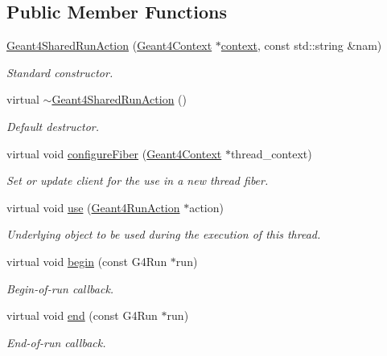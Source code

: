 \subsection*{Public Member Functions}
\begin{DoxyCompactItemize}
\item 
\hyperlink{class_d_d4hep_1_1_simulation_1_1_geant4_shared_run_action_a2d1a2043768ca1aff6aef303ad32b473}{Geant4\+Shared\+Run\+Action} (\hyperlink{class_d_d4hep_1_1_simulation_1_1_geant4_context}{Geant4\+Context} $\ast$\hyperlink{class_d_d4hep_1_1_simulation_1_1_geant4_action_aa9d87f0ec2a72b7fc2591b18f98d75cf}{context}, const std\+::string \&nam)
\begin{DoxyCompactList}\small\item\em Standard constructor. \end{DoxyCompactList}\item 
virtual \hyperlink{class_d_d4hep_1_1_simulation_1_1_geant4_shared_run_action_a519c22826231728b12792015e2a96837}{$\sim$\+Geant4\+Shared\+Run\+Action} ()
\begin{DoxyCompactList}\small\item\em Default destructor. \end{DoxyCompactList}\item 
virtual void \hyperlink{class_d_d4hep_1_1_simulation_1_1_geant4_shared_run_action_a6077a3ce7deb655ef76d4fe4e8dc1b19}{configure\+Fiber} (\hyperlink{class_d_d4hep_1_1_simulation_1_1_geant4_context}{Geant4\+Context} $\ast$thread\+\_\+context)
\begin{DoxyCompactList}\small\item\em Set or update client for the use in a new thread fiber. \end{DoxyCompactList}\item 
virtual void \hyperlink{class_d_d4hep_1_1_simulation_1_1_geant4_shared_run_action_ae0502a99bbdefd87e3b32e5046294585}{use} (\hyperlink{class_d_d4hep_1_1_simulation_1_1_geant4_run_action}{Geant4\+Run\+Action} $\ast$action)
\begin{DoxyCompactList}\small\item\em Underlying object to be used during the execution of this thread. \end{DoxyCompactList}\item 
virtual void \hyperlink{class_d_d4hep_1_1_simulation_1_1_geant4_shared_run_action_a8206dc20bbe8ace921f4e97c7159872a}{begin} (const G4\+Run $\ast$run)
\begin{DoxyCompactList}\small\item\em Begin-\/of-\/run callback. \end{DoxyCompactList}\item 
virtual void \hyperlink{class_d_d4hep_1_1_simulation_1_1_geant4_shared_run_action_af723af818fd7798e910dcfef30092345}{end} (const G4\+Run $\ast$run)
\begin{DoxyCompactList}\small\item\em End-\/of-\/run callback. \end{DoxyCompactList}\end{DoxyCompactItemize}
